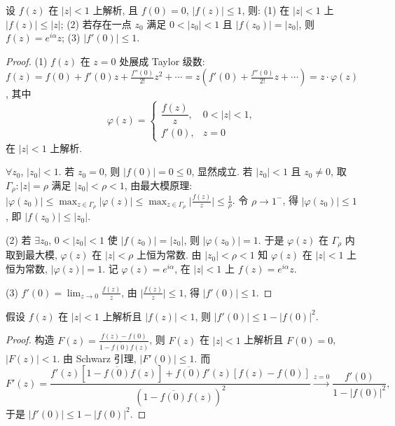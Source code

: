 \documentclass[theorem=false,mathfont=none,openany,sub3section]{easybook}
\begin{document}
\begin{theorem}[Schwarz 引理]
  设 $f(z)$ 在 $|z|<1$ 上解析, 且 $f(0)=0$, $|f(z)|\leq1$, 则:
  (1) 在 $|z|<1$ 上 $|f(z)|\leq|z|$;
  (2) 若存在一点 $z_{0}$ 满足 $0<|z_{0}|<1$ 且 $|f(z_{0})|=|z_{0}|$, 则 $f(z)=e^{i\alpha}z$;
  (3) $|f'(0)|\leq1$.
\end{theorem}

\begin{proof}
  (1) $f(z)$ 在 $z=0$ 处展成 Taylor 级数: $f(z)=f(0)+f'(0)z+\frac{f''(0)}{2!}z^{2}+\cdots=z(f'(0)+\frac{f''(0)}{2!}z+\cdots)=z\cdot\varphi(z)$,
  其中
  \[
  \varphi(z)=
  \begin{cases}
    \dfrac{f(z)}{z}, & 0<|z|<1,\\[4pt]
    f'(0), & z=0
  \end{cases}
  \]
  在 $|z|<1$ 上解析.

  $\forall z_{0}$, $|z_{0}|<1$. 若 $z_{0}=0$, 则 $|f(0)|=0\leq0$, 显然成立.
  若 $|z_{0}|<1$ 且 $z_{0}\neq0$, 取 $\Gamma_{\rho}:|z|=\rho$ 满足 $|z_{0}|<\rho<1$, 由最大模原理:
  $|\varphi(z_{0})|\leq\max_{z\in\Gamma_{\rho}}|\varphi(z)|\leq\max_{z\in\Gamma_{\rho}}\bigl|\frac{f(z)}{z}\bigr|\leq\frac{1}{\rho}$.
  令 $\rho\to1^{-}$, 得 $|\varphi(z_{0})|\leq1$, 即 $|f(z_{0})|\leq|z_{0}|$.

  (2) 若 $\exists z_{0}$, $0<|z_{0}|<1$ 使 $|f(z_{0})|=|z_{0}|$, 则 $|\varphi(z_{0})|=1$.
  于是 $\varphi(z)$ 在 $\Gamma_{\rho}$ 内取到最大模, $\varphi(z)$ 在 $|z|<\rho$ 上恒为常数.
  由 $|z_{0}|<\rho<1$ 知 $\varphi(z)$ 在 $|z|<1$ 上恒为常数, $|\varphi(z)|=1$.
  记 $\varphi(z)=e^{i\alpha}$, 在 $|z|<1$ 上 $f(z)=e^{i\alpha}z$.

  (3) $f'(0)=\lim_{z\to0}\frac{f(z)}{z}$, 由 $\bigl|\frac{f(z)}{z}\bigr|\leq1$, 得 $|f'(0)|\leq1$.
\end{proof}

\begin{example}
  假设 $f(z)$ 在 $|z|<1$ 上解析且 $|f(z)|<1$, 则 $|f'(0)|\leq1-|f(0)|^{2}$.
  \begin{proof}
    构造 $F(z)=\frac{f(z)-f(0)}{1-\overline{f(0)}f(z)}$, 则 $F(z)$ 在 $|z|<1$ 上解析且 $F(0)=0$, $|F(z)|<1$.
    由 Schwarz 引理, $|F'(0)|\leq1$. 而
    \[
    F'(z)=\frac{f'(z)[1-\overline{f(0)}f(z)]+\overline{f(0)}f'(z)[f(z)-f(0)]}{(1-\overline{f(0)}f(z))^{2}}
    \xrightarrow{z=0}\frac{f'(0)}{1-|f(0)|^{2}},
    \]
    于是 $|f'(0)|\leq1-|f(0)|^{2}$.
  \end{proof}
\end{example}

\newpage
\end{document}
